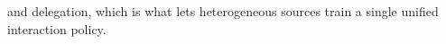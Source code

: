 and delegation, which is what lets heterogeneous sources train a single unified interaction policy.


